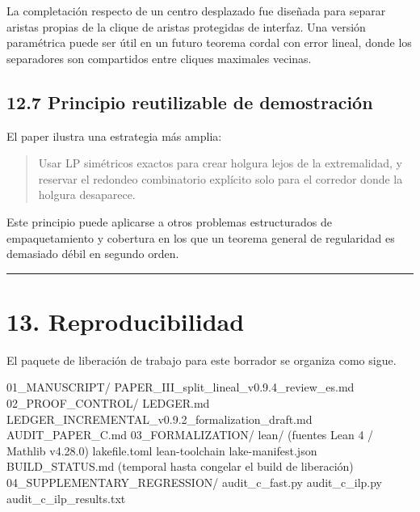 \documentclass[
  11pt,
]{article}
\newenvironment{Shaded}{}{}
\newcommand{\NormalTok}[1]{#1}
\begin{document}
La completación respecto de un centro desplazado fue diseñada para
separar aristas propias de la clique de aristas protegidas de interfaz.
Una versión paramétrica puede ser útil en un futuro teorema cordal con
error lineal, donde los separadores son compartidos entre cliques
maximales vecinas.

\subsection{12.7 Principio reutilizable de
demostración}\label{principio-reutilizable-de-demostraciuxf3n}

El paper ilustra una estrategia más amplia:

\begin{quote}
Usar LP simétricos exactos para crear holgura lejos de la extremalidad,
y reservar el redondeo combinatorio explícito solo para el corredor
donde la holgura desaparece.
\end{quote}

Este principio puede aplicarse a otros problemas estructurados de
empaquetamiento y cobertura en los que un teorema general de regularidad
es demasiado débil en segundo orden.

\begin{center}\rule{0.5\linewidth}{0.5pt}\end{center}

\section{13. Reproducibilidad}\label{reproducibilidad}

El paquete de liberación de trabajo para este borrador se organiza como
sigue.

\begin{Shaded}
\begin{Highlighting}[]
\NormalTok{01\_MANUSCRIPT/}
\NormalTok{    PAPER\_III\_split\_lineal\_v0.9.4\_review\_es.md}
\NormalTok{02\_PROOF\_CONTROL/}
\NormalTok{    LEDGER.md}
\NormalTok{    LEDGER\_INCREMENTAL\_v0.9.2\_formalization\_draft.md}
\NormalTok{    AUDIT\_PAPER\_C.md}
\NormalTok{03\_FORMALIZATION/}
\NormalTok{    lean/                         (fuentes Lean 4 / Mathlib v4.28.0)}
\NormalTok{    lakefile.toml}
\NormalTok{    lean{-}toolchain}
\NormalTok{    lake{-}manifest.json}
\NormalTok{    BUILD\_STATUS.md               (temporal hasta congelar el build de liberación)}
\NormalTok{04\_SUPPLEMENTARY\_REGRESSION/}
\NormalTok{    audit\_c\_fast.py}
\NormalTok{    audit\_c\_ilp.py}
\NormalTok{    audit\_c\_ilp\_results.txt}
\end{Highlighting}
\end{Shaded}
\end{document}
